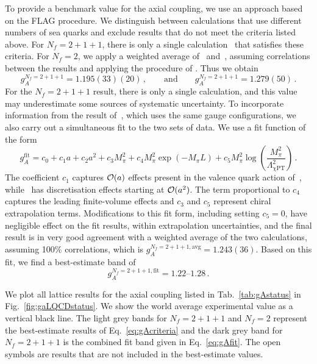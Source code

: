 {To provide a benchmark value for the axial coupling, we use an approach based 
on the FLAG procedure. 
%
We distinguish between calculations that use different numbers of sea quarks 
and exclude results that do not meet the criteria listed above. 
%
For $N_f = 2+1+1$, there is only a single 
calculation~\cite{Bhattacharya:2016zcn} that satisfies these criteria. 
%
For $N_f = 2$, we apply a weighted average of~\cite{Capitani:2017qpc} 
and~\cite{Bali:2014nma}, assuming correlations between the results and 
applying the procedure of \cite{XXX}. 
%
Thus we obtain
\begin{equation}\label{eq:gAcriteria}
g_A^{N_f=2+1+1} = 1.195(33)(20)
\,,\qquad \mathrm{and}\qquad 
g_A^{N_f=2+1+1} = 1.279(50)\,.
\end{equation}
%
For the $N_f = 2+1+1$ result, there is only a single calculation, and this 
value may underestimate some sources of systematic uncertainty. 
%
To incorporate information from the result of~\cite{Berkowitz:2017gql}, 
which uses the same gauge configurations, we also carry out a simultaneous fit 
to the two sets of data. 
%
We use a fit function of the form
\begin{equation}
g_A^{\mathrm{fit}} 
= 
c_0 + 
c_1a + 
c_2a^2 + 
c_3M_\pi^2 + 
c_4M_\pi^2 \exp(−M_\pi L) +
c_5M_\pi^2 \log\left(\frac{M_\pi^2}{\Lambda_{\chi \mathrm{PT}}^2}\right)\,.
\end{equation}
%
The coefficient $c_1$ captures ${\cal O}(a)$ effects present in the valence 
quark action of~\cite{Bhattacharya:2016zcn}, while~\cite{Berkowitz:2017gql} 
has discretisation effects starting at ${\cal O}(a^2)$. 
%
The term proportional to $c_4$ captures the leading finite-volume effects and 
$c_3$ and $c_5$ represent chiral extrapolation terms. 
%
Modifications to this fit form, including  setting $c_5 = 0$, have negligible 
effect on the fit results, within extrapolation uncertainties, and the final 
result is in very good agreement with a weighted average of the two 
calculations, assuming 100\% correlations, which is 
$g_A^{N_f=2+1+1,\mathrm{avg}} = 1.243(36)$. 
%
Based on this fit, we find a best-estimate band of
\begin{equation}\label{eq:gAfit}
g_A^{N_f=2+1+1,\mathrm{fit}} = \numrange{1.22}{1.28}\,.
\end{equation}

We plot all lattice results for the axial coupling listed in 
Tab.~\ref{tab:gAstatus} in Fig.~\ref{fig:gaLQCDstatus}. 
%
We show the world average experimental value as a vertical
black line. 
%
The light grey bands for $N_f = 2+1+1$ and $N_f=2$ represent the best-estimate 
results of Eq.~\eqref{eq:gAcriteria} and the dark grey band for
$N_f = 2+1+1$ is the combined fit band given in Eq.~\eqref{eq:gAfit}. 
%
The open symbols are results that are not included in the best-estimate values.

}
